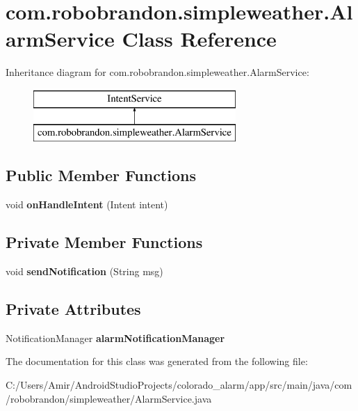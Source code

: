 \hypertarget{classcom_1_1robobrandon_1_1simpleweather_1_1_alarm_service}{}\section{com.\+robobrandon.\+simpleweather.\+Alarm\+Service Class Reference}
\label{classcom_1_1robobrandon_1_1simpleweather_1_1_alarm_service}
Inheritance diagram for com.\+robobrandon.\+simpleweather.\+Alarm\+Service\+:\begin{figure}[H]
\begin{center}
\leavevmode
\includegraphics[height=2.000000cm]{classcom_1_1robobrandon_1_1simpleweather_1_1_alarm_service}
\end{center}
\end{figure}
\subsection*{Public Member Functions}
\begin{DoxyCompactItemize}
\item 
void {\bfseries on\+Handle\+Intent} (Intent intent)\hypertarget{classcom_1_1robobrandon_1_1simpleweather_1_1_alarm_service_a2a2bebc18c00a0de0a18cd2c4e912537}{}\label{classcom_1_1robobrandon_1_1simpleweather_1_1_alarm_service_a2a2bebc18c00a0de0a18cd2c4e912537}

\end{DoxyCompactItemize}
\subsection*{Private Member Functions}
\begin{DoxyCompactItemize}
\item 
void {\bfseries send\+Notification} (String msg)\hypertarget{classcom_1_1robobrandon_1_1simpleweather_1_1_alarm_service_a054f4f065a13580922c9cadfe1534e64}{}\label{classcom_1_1robobrandon_1_1simpleweather_1_1_alarm_service_a054f4f065a13580922c9cadfe1534e64}

\end{DoxyCompactItemize}
\subsection*{Private Attributes}
\begin{DoxyCompactItemize}
\item 
Notification\+Manager {\bfseries alarm\+Notification\+Manager}\hypertarget{classcom_1_1robobrandon_1_1simpleweather_1_1_alarm_service_a6f91d2b5874de28aac899354af70fb3f}{}\label{classcom_1_1robobrandon_1_1simpleweather_1_1_alarm_service_a6f91d2b5874de28aac899354af70fb3f}

\end{DoxyCompactItemize}


The documentation for this class was generated from the following file\+:\begin{DoxyCompactItemize}
\item 
C\+:/\+Users/\+Amir/\+Android\+Studio\+Projects/colorado\+\_\+alarm/app/src/main/java/com/robobrandon/simpleweather/Alarm\+Service.\+java\end{DoxyCompactItemize}

